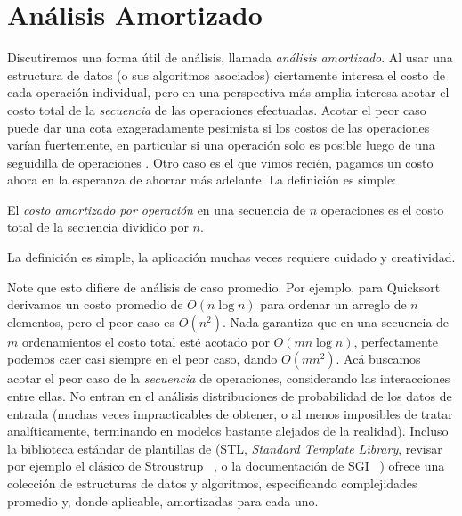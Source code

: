 

\chapter{Análisis Amortizado}
\label{cha:analisis-amortizado}

  Discutiremos una forma útil de análisis,
  llamada \emph{análisis amortizado}.
  Al usar una estructura de datos
  (o sus algoritmos asociados)
  ciertamente interesa el costo de cada operación individual,
  pero en una perspectiva más amplia
  interesa acotar el costo total
  de la \emph{secuencia} de las operaciones efectuadas.
  Acotar el peor caso puede dar una cota exageradamente pesimista
  si los costos de las operaciones varían fuertemente,
  en particular si una operación 
  solo es posible luego de una seguidilla de operaciones .
  Otro caso es el que vimos recién,
  pagamos un costo ahora en la esperanza de ahorrar más adelante.
  La definición es simple:
  \begin{definition}
    \label{def:analisis-amortizado}
    El \emph{costo amortizado por operación}
    en una secuencia de \(n\) operaciones es el costo total de la secuencia
    dividido por \(n\).
  \end{definition}
  La definición es simple,
  la aplicación muchas veces requiere cuidado y creatividad.

  Note que esto difiere de análisis de caso promedio.
  Por ejemplo,
  para Quicksort derivamos un costo promedio de \(O(n \log n)\)
  para ordenar un arreglo de \(n\) elementos,
  pero el peor caso es \(O(n^2)\).
  Nada garantiza que en una secuencia de \(m\) ordenamientos
  el costo total esté acotado por \(O(m n \log n)\),
  perfectamente podemos caer casi siempre en el peor caso,
  dando \(O(m n^2)\).
  Acá buscamos acotar el peor caso de la \emph{secuencia} de operaciones,
  considerando las interacciones entre ellas.
  No entran en el análisis
  distribuciones de probabilidad de los datos de entrada
  (muchas veces impracticables de obtener,
   o al menos imposibles de tratar analíticamente,
   terminando en modelos bastante alejados de la realidad).
  Incluso la biblioteca estándar de plantillas de \cplusplus{}
  (STL,
   \emph{\foreignlanguage{english}{Standard Template Library}},
   revisar por ejemplo el clásico de Stroustrup~%
     \cite{stroustrup13:_C++_progr_lang},
   o la documentación de SGI~%
     \cite{SGI00:_STL,
           SGI00:_STL_complexity})
  ofrece una colección de estructuras de datos y algoritmos,
  especificando complejidades promedio
  y,
  donde aplicable,
  amortizadas para cada uno.

